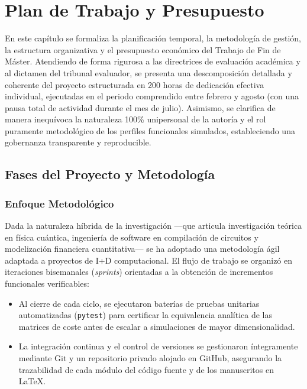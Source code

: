 \chapter{Plan de Trabajo y Presupuesto}
\label{cap:plan_trabajo_presupuesto}

En este capítulo se formaliza la planificación temporal, la metodología de gestión, la estructura organizativa y el presupuesto económico del Trabajo de Fin de Máster. Atendiendo de forma rigurosa a las directrices de evaluación académica y al dictamen del tribunal evaluador, se presenta una descomposición detallada y coherente del proyecto estructurada en 200 horas de dedicación efectiva individual, ejecutadas en el periodo comprendido entre febrero y agosto (con una pausa total de actividad durante el mes de julio). Asimismo, se clarifica de manera inequívoca la naturaleza 100\% unipersonal de la autoría y el rol puramente metodológico de los perfiles funcionales simulados, estableciendo una gobernanza transparente y reproducible.

\section{Fases del Proyecto y Metodología}
\label{sec:fases_metodologia}

\subsection{Enfoque Metodológico}
\label{subsec:enfoque_metodologico}

Dada la naturaleza híbrida de la investigación ---que articula investigación teórica en física cuántica, ingeniería de software en compilación de circuitos y modelización financiera cuantitativa--- se ha adoptado una metodología ágil adaptada a proyectos de I+D computacional. El flujo de trabajo se organizó en iteraciones bisemanales (\textit{sprints}) orientadas a la obtención de incrementos funcionales verificables:
\begin{itemize}
    \item Al cierre de cada ciclo, se ejecutaron baterías de pruebas unitarias automatizadas (\texttt{pytest}) para certificar la equivalencia analítica de las matrices de coste antes de escalar a simulaciones de mayor dimensionalidad.
    \item La integración continua y el control de versiones se gestionaron íntegramente mediante Git y un repositorio privado alojado en GitHub, asegurando la trazabilidad de cada módulo del código fuente y de los manuscritos en \LaTeX.
\end{itemize}

